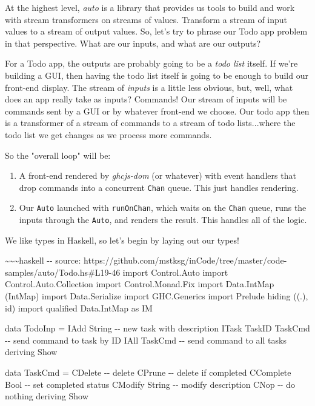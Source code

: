 \documentclass[]{article}
\begin{document}
At the highest level, \emph{auto} is a library that provides us tools to build
and work with stream transformers on streams of values. Transform a stream of
input values to a stream of output values. So, let's try to phrase our Todo app
problem in that perspective. What are our inputs, and what are our outputs?

For a Todo app, the outputs are probably going to be a \emph{todo list} itself.
If we're building a GUI, then having the todo list itself is going to be enough
to build our front-end display. The stream of \emph{inputs} is a little less
obvious, but, well, what does an app really take as inputs? Commands! Our stream
of inputs will be commands sent by a GUI or by whatever front-end we choose. Our
todo app then is a transformer of a stream of commands to a stream of todo
lists...where the todo list we get changes as we process more commands.

So the "overall loop" will be:

\begin{enumerate}
\tightlist
\item
  A front-end rendered by \emph{ghcjs-dom} (or whatever) with event handlers
  that drop commands into a concurrent \texttt{Chan} queue. This just handles
  rendering.
\item
  Our \texttt{Auto} launched with \texttt{runOnChan}, which waits on the
  \texttt{Chan} queue, runs the inputs through the \texttt{Auto}, and renders
  the result. This handles all of the logic.
\end{enumerate}

We like types in Haskell, so let's begin by laying out our types!

\textasciitilde{}\textasciitilde{}\textasciitilde{}haskell -\/- source:
https://github.com/mstksg/inCode/tree/master/code-samples/auto/Todo.hs\#L19-46
import Control.Auto import Control.Auto.Collection import Control.Monad.Fix
import Data.IntMap (IntMap) import Data.Serialize import GHC.Generics import
Prelude hiding ((.), id) import qualified Data.IntMap as IM

data TodoInp = IAdd String -\/- new task with description \textbar{} ITask
TaskID TaskCmd -\/- send command to task by ID \textbar{} IAll TaskCmd -\/- send
command to all tasks deriving Show

data TaskCmd = CDelete -\/- delete \textbar{} CPrune -\/- delete if completed
\textbar{} CComplete Bool -\/- set completed status \textbar{} CModify String
-\/- modify description \textbar{} CNop -\/- do nothing deriving Show
\end{document}
